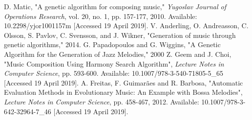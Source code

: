 \documentclass[conference]{IEEEtran}
\begin{document}
\begin{thebibliography}{00}
 D. Matic, "A genetic algorithm for composing music," \textit{Yugoslav Journal of Operations Research}, vol. 20, no. 1, pp. 157-177, 2010. Available: 10.2298/yjor1001157m [Accessed 19 April 2019].
V. Anderling, O. Andreasson, C. Olsson, S. Pavlov, C. Svensson, and J. Wikner, "Generation of music through genetic algorithms," 2014.
G. Papadopoulos and G. Wiggins, "A Genetic Algorithm for the Generation of Jazz Melodies," 2000
 Z. Geem and J. Choi, "Music Composition Using Harmony Search Algorithm", \textit{Lecture Notes in Computer Science}, pp. 593-600. Available: 10.1007/978-3-540-71805-5\_65 [Accessed 19 April 2019].
 A. Freitas, F. Guimarães and R. Barbosa, "Automatic Evaluation Methods in Evolutionary Music: An Example with Bossa Melodies", \textit{Lecture Notes in Computer Science}, pp. 458-467, 2012. Available: 10.1007/978-3-642-32964-7\_46 [Accessed 19 April 2019].
\end{thebibliography}
\end{document}
